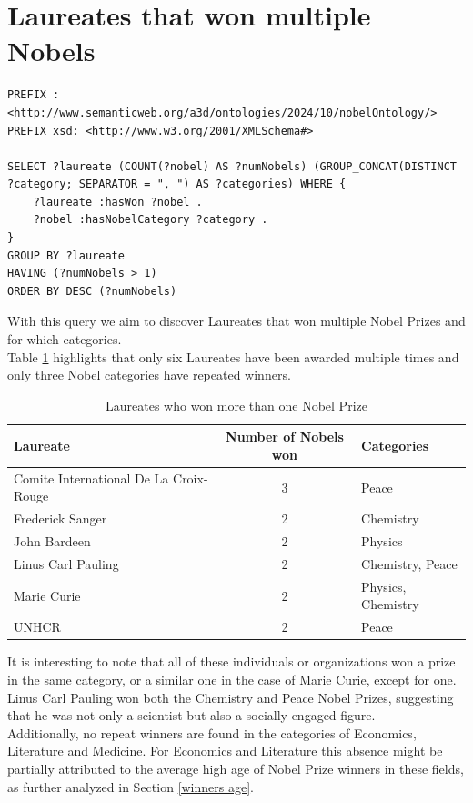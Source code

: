 \documentclass{article}
\begin{document}
\newpage

\section{Laureates that won multiple Nobels}

\begin{lstlisting}
PREFIX : <http://www.semanticweb.org/a3d/ontologies/2024/10/nobelOntology/>
PREFIX xsd: <http://www.w3.org/2001/XMLSchema#>

SELECT ?laureate (COUNT(?nobel) AS ?numNobels) (GROUP_CONCAT(DISTINCT ?category; SEPARATOR = ", ") AS ?categories) WHERE {
    ?laureate :hasWon ?nobel .
    ?nobel :hasNobelCategory ?category .
}
GROUP BY ?laureate
HAVING (?numNobels > 1)
ORDER BY DESC (?numNobels)
\end{lstlisting}
With this query we aim to discover Laureates that won multiple Nobel Prizes and for which categories.\\
Table \ref{tab:moreThanOneNobel} highlights that only six Laureates have been awarded multiple times and only three
Nobel categories have repeated winners.

\begin{table}[H]
	\centering
	\begin{tabular}{|l|c|l|}
		\hline
		\textbf{Laureate}                      & \textbf{Number of Nobels won} & \textbf{Categories} \\ \hline
		Comite International De La Croix-Rouge & 3                             & Peace               \\ \hline
		Frederick Sanger                       & 2                             & Chemistry           \\ \hline
		John Bardeen                           & 2                             & Physics             \\ \hline
		Linus Carl Pauling                     & 2                             & Chemistry, Peace    \\ \hline
		Marie Curie                            & 2                             & Physics, Chemistry  \\ \hline
		UNHCR                                  & 2                             & Peace               \\ \hline
	\end{tabular}
	\caption{Laureates who won more than one Nobel Prize}
	\label{tab:moreThanOneNobel}
\end{table}

It is interesting to note that all of these individuals or organizations won a prize in the same category,
or a similar one in the case of Marie Curie, except for one. Linus Carl Pauling won both the Chemistry and Peace Nobel Prizes,
suggesting that he was not only a scientist but also a socially engaged figure.\\
Additionally, no repeat winners are found in the categories of Economics, Literature and Medicine.
For Economics and Literature this absence might be partially attributed to the average high age of Nobel Prize
winners in these fields, as further analyzed in Section \ref{winners age}.\\
\end{document}
